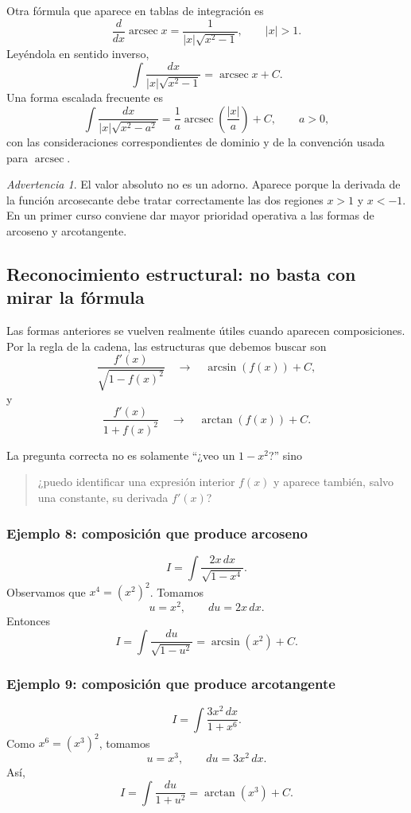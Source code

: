 \documentclass[12pt]{article}
\theoremstyle{definition}
\theoremstyle{remark}
\newtheorem*{advertencia}{Advertencia}
\begin{document}
Otra fórmula que aparece en tablas de integración es
\[
\frac{d}{dx}\operatorname{arcsec}x
=\frac1{|x|\sqrt{x^2-1}},\qquad |x|>1.
\]
Leyéndola en sentido inverso,
\[
\boxed{\int\frac{dx}{|x|\sqrt{x^2-1}}
=\operatorname{arcsec}x+C.}
\]
Una forma escalada frecuente es
\[
\boxed{\int\frac{dx}{|x|\sqrt{x^2-a^2}}
=\frac1a\operatorname{arcsec}\left(\frac{|x|}{a}\right)+C,\qquad a>0,}
\]
con las consideraciones correspondientes de dominio y de la convención usada
para $\operatorname{arcsec}$.

\begin{advertencia}
El valor absoluto no es un adorno. Aparece porque la derivada de la función
arcosecante debe tratar correctamente las dos regiones $x>1$ y $x<-1$. En un
primer curso conviene dar mayor prioridad operativa a las formas de arcoseno
y arcotangente.
\end{advertencia}

\subsection{Reconocimiento estructural: no basta con mirar la fórmula}

Las formas anteriores se vuelven realmente útiles cuando aparecen
composiciones. Por la regla de la cadena, las estructuras que debemos buscar
son
\[
\boxed{\frac{f'(x)}{\sqrt{1-f(x)^2}}}
\quad\longrightarrow\quad
\arcsin(f(x))+C,
\]
y
\[
\boxed{\frac{f'(x)}{1+f(x)^2}}
\quad\longrightarrow\quad
\arctan(f(x))+C.
\]

La pregunta correcta no es solamente ``¿veo un $1-x^2$?'' sino
\begin{quote}
¿puedo identificar una expresión interior $f(x)$ y aparece también, salvo una
constante, su derivada $f'(x)$?
\end{quote}

\subsubsection*{Ejemplo 8: composición que produce arcoseno}
\[
I=\int\frac{2x\,dx}{\sqrt{1-x^4}}.
\]
Observamos que $x^4=(x^2)^2$. Tomamos
\[
u=x^2,\qquad du=2x\,dx.
\]
Entonces
\[
I=\int\frac{du}{\sqrt{1-u^2}}
=\boxed{\arcsin(x^2)+C}.
\]

\subsubsection*{Ejemplo 9: composición que produce arcotangente}
\[
I=\int\frac{3x^2\,dx}{1+x^6}.
\]
Como $x^6=(x^3)^2$, tomamos
\[
u=x^3,\qquad du=3x^2\,dx.
\]
Así,
\[
I=\int\frac{du}{1+u^2}
=\boxed{\arctan(x^3)+C}.
\]
\end{document}
